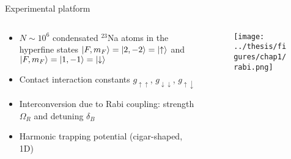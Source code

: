 \documentclass[aspectratio=169]{beamer}
\begin{document}


\begin{frame}{Experimental platform}
  \begin{columns}
    \begin{column}{0.5\textwidth}
      \begin{itemize}
        \item $N\sim10^6$ condensated $^{23}$Na atoms in the hyperfine states $\ket{F,m_F} = \ket{2, -2} = \ket{\uparrow}$ and $\ket{F,m_F} = \ket{1, -1} = \ket{\downarrow}$
        \item Contact interaction constants $g_{\uparrow\uparrow}$, $g_{\downarrow\downarrow}$, $g_{\uparrow\downarrow}$
        \item Interconversion due to Rabi coupling: strength $\Omega_R$ and detuning $\delta_B$
        \item Harmonic trapping potential (cigar-shaped, 1D)
      \end{itemize}
    \end{column}
    \begin{column}{0.5\textwidth}
      \begin{figure}
        \centering
        \texttt{[image: ../thesis/figures/chap1/rabi.png]}
      \end{figure}
    \end{column}
  \end{columns}
\end{frame}
\end{document}
